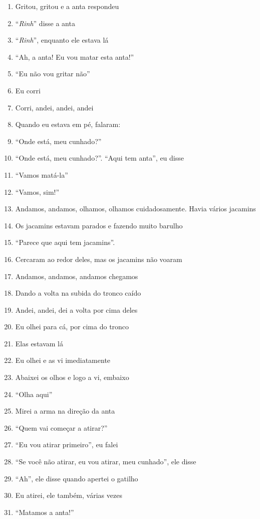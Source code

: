 \begin{enumerate}
 \item Gritou, gritou e a anta respondeu
 \item ``\textit{Rinh}'' disse a anta
 \item ``\textit{Rinh}'', enquanto ele estava lá
 \item ``Ah, a anta! Eu vou matar esta anta!''
 \item ``Eu não vou gritar não''
 \item Eu corri
 \item Corri, andei, andei, andei
 \item Quando eu estava em pé, falaram:
 \item ``Onde está, meu cunhado?''
 \item ``Onde está, meu cunhado?''. ``Aqui tem anta'', eu disse
 \item ``Vamos matá-la''
 \item ``Vamos, sim!''
 \begin{center}\end{center}
 \item Andamos, andamos, olhamos, olhamos cuidadosamente. Havia vários jacamins
 \item Os jacamins estavam parados e fazendo muito barulho
 \item ``Parece que aqui tem jacamins''.
 \item Cercaram ao redor deles, mas os jacamins não voaram
 \item Andamos, andamos, andamos chegamos
 \item Dando a volta na subida do tronco caído
 \item Andei, andei, dei a volta por cima deles
 \item Eu olhei para cá, por cima do tronco
 \item Elas estavam lá
 \item Eu olhei e as vi imediatamente
 \item Abaixei os olhos e logo a vi, embaixo
 \item ``Olha aqui''
 \item Mirei a arma na direção da anta
 \item ``Quem vai começar a atirar?''
 \item ``Eu vou atirar primeiro'', eu falei
 \item ``Se você não atirar, eu vou atirar, meu cunhado'', ele disse
 \item ``Ah'', ele disse quando apertei o gatilho
 \item Eu atirei, ele também, várias vezes
 \item ``Matamos a anta!''

\end{enumerate}
